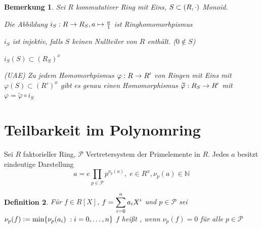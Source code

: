 \documentclass[a4paper,10pt,german]{scrbook}
\theoremstyle{saetze}
\theoremstyle{definitionen}
\newtheorem{Def}{Definition}[section]
\newtheorem{Bem}[Def]{Bemerkung}
\begin{document}
\begin{Bem}
Sei $R$ kommutativer Ring mit Eins, $S
\subset (R,\cdot)$ Monoid.
\begin{enum}
\item Die Abbildung $i_S: R\rightarrow R_S, a\mapsto \frac{a}{1}$ ist
Ringhomomorhpismus

\item $i_S$ ist injektiv, falls $S$ keinen Nullteiler von $R$
enthält. ($0 \not \in S$)


\item $i_S(S) \subset (R_S)^x$


\item (UAE) Zu jedem Homomorhpismus $\varphi: R \rightarrow R'$ von Ringen
mit Eins mit $\varphi(S) \subset (R')^x$ gibt es genau einen
Homomorphismus $\widetilde{\varphi}:R_S \rightarrow R'$ mit $\varphi =
\widetilde{\varphi} \circ i_S$


\end{enum}
\end{Bem}

\section{Teilbarkeit im Polynomring}

Sei $R$ faktorieller Ring, $\mathcal{P}$ Vertretersystem
der Primelemente in $R$. Jedes $a$ besitzt eindeutige Darstellung
\[a= e \prod_{p \in \mathcal{P}} p^{\nu_p(a)},\; e \in R^x, \nu_p(a)
\in \mathbb{N}\]

\begin{Def}
Für $f \in R[X]$, $\displaystyle f = \sum_{i=0}^n a_i
X^i$ und $p \in \mathcal{P}$ sei $\nu_p(f) \mathrel{\mathop:}=
\min\{\nu_p(a_i)\;: i=0,\dots,n\}$
\newline $f$ heißt , wenn $\nu_p(f) = 0$ für alle $p
\in \mathcal{P}$
\end{Def}
\end{document}
